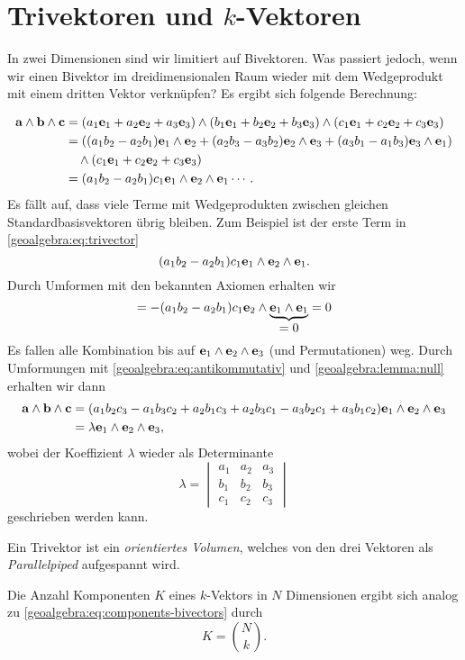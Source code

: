 \section{Trivektoren und $k$-Vektoren}
\label{geoalgebra:section:trivectors-n-vectors}
In zwei Dimensionen sind wir limitiert auf Bivektoren. Was passiert jedoch, wenn wir einen Bivektor
im dreidimensionalen Raum wieder mit dem Wedgeprodukt mit einem dritten Vektor verknüpfen?
Es ergibt sich folgende Berechnung:
{
\begin{align} 
\mathbf{a} \wedge \mathbf{b} \wedge \mathbf{c}
&=
(a_1 \mathbf{e}_1 + a_2 \mathbf{e}_2 + a_3 \mathbf{e}_3) \wedge (b_1 \mathbf{e}_1 + b_2 \mathbf{e}_2 + b_3 \mathbf{e}_3) \wedge (c_1 \mathbf{e}_1 + c_2 \mathbf{e}_2 + c_3 \mathbf{e}_3)
\notag
\\
&=
((a_1 b_2 - a_2 b_1) \mathbf{e}_1 \wedge \mathbf{e}_2 +(a_2 b_3 - a_3 b_2) \mathbf{e}_2 \wedge \mathbf{e}_3 +(a_3 b_1 - a_1 b_3) \mathbf{e}_3 \wedge \mathbf{e}_1)
\notag
\\
&\quad\wedge (c_1 \mathbf{e}_1 + c_2 \mathbf{e}_2 + c_3 \mathbf{e}_3)
\notag
\\
&=
(a_1 b_2 - a_2 b_1) c_1 \mathbf{e}_1 \wedge \mathbf{e}_2 \wedge \mathbf{e}_1 \cdots.
\label{geoalgebra:eq:trivector}
\end{align}
Es fällt auf, dass viele Terme mit Wedgeprodukten zwischen gleichen Standardbasisvektoren übrig bleiben. Zum Beispiel ist der erste Term in \eqref{geoalgebra:eq:trivector}
\begin{equation*}
(a_1 b_2 - a_2 b_1) c_1 \mathbf{e}_1 \wedge \mathbf{e}_2 \wedge \mathbf{e}_1.
\end{equation*}
Durch Umformen mit den bekannten Axiomen erhalten wir
\begin{equation*}
=-(a_1 b_2 - a_2 b_1) c_1 \mathbf{e}_2 \wedge \underbrace{\mathbf{e}_1 \wedge \mathbf{e}_1}_{\displaystyle =0} = 0
\end{equation*}
Es fallen alle Kombination bis auf $\mathbf{e}_1 \wedge \mathbf{e}_2 \wedge \mathbf{e}_3$ (und Permutationen) weg.
Durch Umformungen mit
\eqref{geoalgebra:eq:antikommutativ} und
\eqref{geoalgebra:lemma:null}
erhalten wir dann
\begin{align*}
  \mathbf{a} \wedge \mathbf{b} \wedge \mathbf{c} &= (a_1 b_2 c_3 - a_1 b_3 c_2 + a_2 b_1 c_3 + a_2 b_3 c_1 - a_3 b_2 c_1 + a_3 b_1 c_2) \mathbf{e}_1 \wedge \mathbf{e}_2 \wedge \mathbf{e}_3 \\
  &= \lambda \mathbf{e}_1 \wedge \mathbf{e}_2 \wedge \mathbf{e}_3,
\end{align*}
wobei der Koeffizient $\lambda$ wieder als Determinante
%
\begin{equation*}
\lambda = \begin{vmatrix} a_1 & a_2 & a_3 \\ b_1 & b_2 & b_3 \\ c_1 & c_2 & c_3 \end{vmatrix}
\end{equation*}
geschrieben werden kann.

Ein Trivektor ist ein \emph{orientiertes Volumen}, welches von den drei Vektoren als \emph{Parallelpiped} aufgespannt wird.
%
%
%

Die Anzahl Komponenten $K$ eines $k$-Vektors in $N$ Dimensionen ergibt sich analog zu \eqref{geoalgebra:eq:components-bivectors} durch
\begin{equation*}
  K = \binom{N}{k}.
\end{equation*}
}
